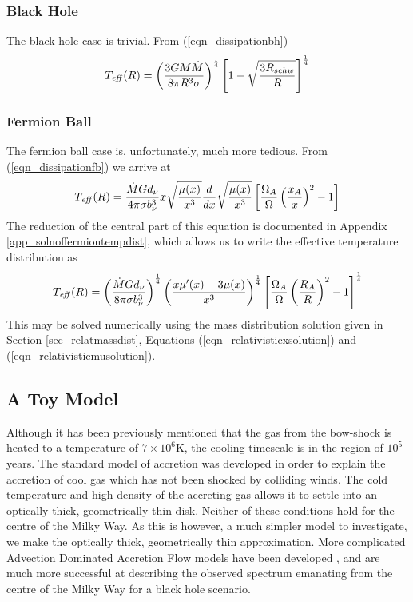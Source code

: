 \subsubsection{Black Hole}
The black hole case is trivial. From (\ref{eqn_dissipationbh})
\begin{equation}
	T_{{\rm {\it eff}}}(R)=\left(\frac{3GM\dot{M}}{8\pi R^3\sigma}\right)^{\frac{1}{4}}\left[1-\sqrt{\frac{3R_{schw}}{R}}\right]^{\frac{1}{4}}
	\label{eqn_blackholeeffectivetemp}
\end{equation}

\subsubsection{Fermion Ball}
\label{sec_fermionballtempdist}
The fermion ball case is, unfortunately, much more tedious. From (\ref{eqn_dissipationfb}) we arrive at
\begin{equation}
	T_{{\rm {\it eff}}}(R)=\frac{\dot{M}Gd_\nu}{4\pi \sigma b_\nu^3}x\sqrt{\frac{\mu(x)}{x^3}}\frac{d}{dx}\sqrt{\frac{\mu(x)}{x^3}}
		\left[\frac{\Omega_A}{\Omega}\left(\frac{x_A}{x}\right)^2-1\right]
	\label{eqn_fbeffectivetemp}
\end{equation}
The reduction of the central part of this equation is documented in Appendix \ref{app_solnoffermiontempdist}, which allows us to write
the effective temperature distribution as
\begin{equation}
	T_{{\rm {\it eff}}}(R)=\left(\frac{\dot{M}Gd_\nu}{8\pi \sigma b_\nu^3}\right)^{\frac{1}{4}}
		   \left(\frac{x\mu '(x)-3\mu(x)}{x^3}\right)^{\frac{1}{4}}
		   \left[\frac{\Omega_A}{\Omega} \left(\frac{R_A}{R}\right)^2-1\right]^{\frac{1}{4}}
	\label{eqn_fermioneffectivetemp}
\end{equation}
This may be solved numerically using the mass distribution solution given in Section \ref{sec_relatmassdist}, Equations
(\ref{eqn_relativisticxsolution}) and (\ref{eqn_relativisticmusolution}).

\subsection{A Toy Model}
Although it has been previously mentioned that the gas from the bow-shock is heated to a temperature of $7 \times 10^6$K, the
cooling timescale is in the region of $10^5$ years. The standard model of accretion was developed in order to explain the
accretion of cool gas which has not been shocked by colliding winds. The cold temperature and high density of the accreting gas
allows it to settle into an optically thick, geometrically thin disk. Neither of these conditions hold for the centre of the
Milky Way. As this is however, a much simpler model to investigate, we make the optically thick, geometrically thin approximation.
More complicated Advection Dominated Accretion Flow models have been developed \cite{ref_rees, ref_narayan}, and are much more successful
at describing the observed spectrum emanating from the centre of the Milky Way for a black hole scenario.


